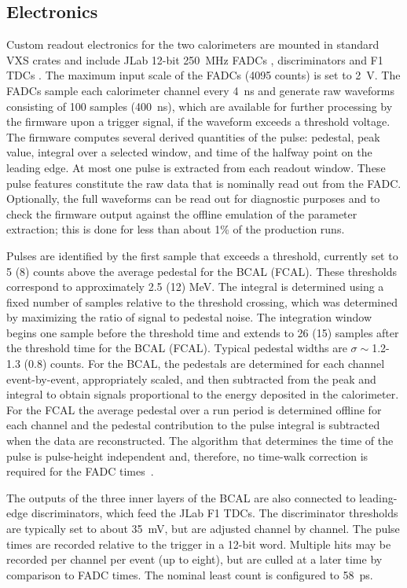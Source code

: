 \subsection{Electronics \label{sec:calelectronics}}
Custom readout electronics for the two calorimeters are mounted in standard VXS crates and include 
JLab 12-bit 250~MHz FADCs \cite{hdnote1022}, discriminators \cite{hdnote2511} and F1 TDCs \cite{hdnote1021}. The maximum input scale of the FADCs (4095 counts) is set to 2~V.
The FADCs sample each calorimeter channel every 4~ns and generate raw waveforms consisting of 100 samples 
 (400~ns), which are available for further processing by the firmware upon a trigger signal, if the waveform exceeds a threshold voltage. The firmware computes several derived quantities of the pulse: pedestal, peak value, integral over a selected window, and time of the halfway point on the leading edge. At most one pulse is extracted from each readout window. These pulse features constitute the raw data that is nominally read out from the FADC.  Optionally, the full waveforms can be read out for diagnostic purposes and to check the firmware output against the offline emulation of the parameter extraction; this is done for less than about 1\% of the production runs.
 
Pulses are identified by the first sample that exceeds a threshold, currently set to 5 (8) counts above the average pedestal for the BCAL (FCAL). These thresholds correspond to approximately 2.5 (12) MeV. The integral is determined using a fixed number of samples relative to the threshold crossing, which was determined by maximizing the ratio of signal to pedestal noise.  The integration window begins one sample before the threshold time and extends to 26 (15) samples after the threshold time for the BCAL (FCAL).  Typical pedestal widths are $\sigma\sim$1.2-1.3 (0.8) counts. For the BCAL, the pedestals are determined for each channel event-by-event, appropriately scaled, and then subtracted from the peak and integral to obtain signals proportional to the energy deposited in the calorimeter. For the FCAL the average pedestal over a run period is determined offline for each channel and the pedestal contribution to the pulse integral is subtracted when the data are reconstructed.  %
 The algorithm that determines the time of the pulse is pulse-height independent and, therefore, no time-walk correction is required for the FADC times~\cite{Bennett:2010nf}.

The outputs of the three inner layers of the BCAL are also connected to leading-edge discriminators, which feed the JLab F1 TDCs. The discriminator thresholds are typically set to about 35~mV, but are adjusted
 channel by channel.  The pulse times are recorded relative to the trigger in a 12-bit word. Multiple hits may be recorded per channel per event (up to eight), but are culled at a later time by comparison to FADC times. The nominal least count is configured to 58~ps.



